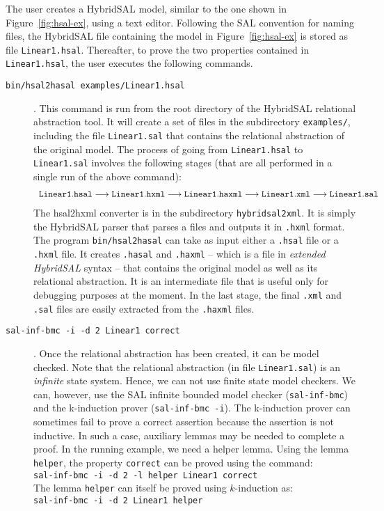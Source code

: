 \documentclass{article}
\begin{document}
The user creates a HybridSAL model, similar to the one shown 
in Figure~\ref{fig:hsal-ex}, using a text editor.
Following the SAL convention for naming files, the HybridSAL file containing
the model in Figure~\ref{fig:hsal-ex} is stored as file
{\tt{Linear1.hsal}}.
Thereafter, to prove the two properties contained in 
{\tt{Linear1.hsal}}, the user executes the
following commands.
\begin{description}
\item[{\tt{bin/hsal2hasal examples/Linear1.hsal}}].
This command is run from
the root directory of the HybridSAL relational abstraction tool.
It will create a set of files in the subdirectory {\tt{examples/}},
including the file {\tt{Linear1.sal}} that contains the
relational abstraction of the original model.
The process of going from {\tt{Linear1.hsal}} to 
{\tt{Linear1.sal}} involves the following stages
(that are all performed in a single run of the above command):
\[
\begin{array}{rclclclcl}
{\tt{Linear1.hsal}} \longrightarrow
{\tt{Linear1.hxml}} \longrightarrow
{\tt{Linear1.haxml}} \longrightarrow 
{\tt{Linear1.xml}} \longrightarrow
{\tt{Linear1.sal}}
\end{array}
\]
The hsal2hxml converter is in the subdirectory 
{\tt{hybridsal2xml}}.  It is simply the HybridSAL
parser that parses a files and outputs it in {\tt{.hxml}} 
format.  The program {\tt{bin/hsal2hasal}} can take as input
either a {\tt{.hsal}} file or a {\tt{.hxml}} file.
It creates {\tt{.hasal}} and {\tt{.haxml}} -- which is 
a file in {\em{extended HybridSAL}} syntax -- that contains
the original model as well as its relational abstraction.
It is an intermediate file that is useful only for debugging
purposes at the moment.
In the last stage, the final {\tt{.xml}} and {\tt{.sal}} files 
are easily extracted
from the {\tt{.haxml}} files.
\item[{\tt{sal-inf-bmc -i -d 2 Linear1 correct}}].
Once the relational abstraction has been created, it can be 
model checked.  Note that the relational abstraction (in
file {\tt{Linear1.sal}}) is an {\em{infinite}} state system.
Hence, we can not use finite state model checkers. 
We can, however, use the SAL infinite bounded model checker
({\tt{sal-inf-bmc}}) and 
the k-induction prover
({\tt{sal-inf-bmc -i}}).
The k-induction prover can sometimes fail to prove a correct
assertion because the assertion is not inductive. In such a
case, auxiliary lemmas may be needed to complete a proof.
In the running example, we need a helper lemma.
Using the lemma {\tt{helper}}, the property {\tt{correct}}
can be proved using the command:
\\
 {\tt{sal-inf-bmc -i -d 2 -l helper Linear1 correct}}
\\
The lemma {\tt{helper}} can itself be proved using $k$-induction
as:
\\
 {\tt{sal-inf-bmc -i -d 2 Linear1 helper}}
\end{description}
\end{document}
